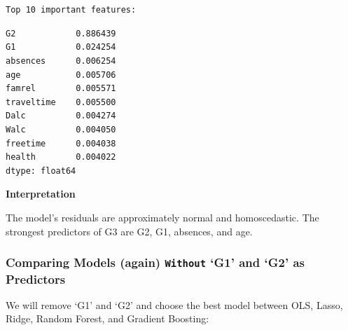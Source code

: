 \documentclass[9pt]{article}
\begin{document}
    \begin{center}
    \end{center}
    { \hspace*{\fill} \\}
    
    \begin{center}
    \end{center}
    { \hspace*{\fill} \\}
    
    \begin{Verbatim}[commandchars=\\\{\}]
Top 10 important features:
    \end{Verbatim}

    
    \begin{Verbatim}[commandchars=\\\{\}]
G2            0.886439
G1            0.024254
absences      0.006254
age           0.005706
famrel        0.005571
traveltime    0.005500
Dalc          0.004274
Walc          0.004050
freetime      0.004038
health        0.004022
dtype: float64
    \end{Verbatim}

    
    \textbf{Interpretation}

The model's residuals are approximately normal and homoscedastic. The
strongest predictors of G3 are G2, G1, absences, and age.

    \hypertarget{comparing-models-again-without-g1-and-g2-as-predictors}{%
\subsubsection{\texorpdfstring{Comparing Models (again) \texttt{Without}
`G1' and `G2' as
Predictors}{Comparing Models (again) Without `G1' and `G2' as Predictors}}\label{comparing-models-again-without-g1-and-g2-as-predictors}}

We will remove `G1' and `G2' and choose the best model between OLS,
Lasso, Ridge, Random Forest, and Gradient Boosting:
\end{document}

